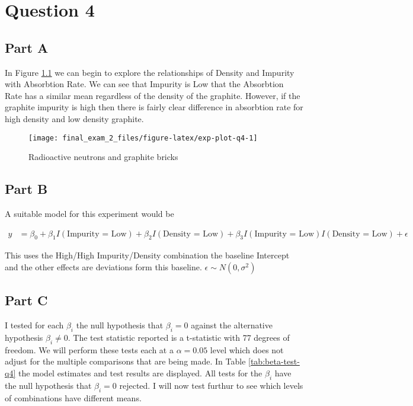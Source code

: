 \documentclass[]{book}
\begin{document}
\hypertarget{question-4}{%
\chapter{Question 4}\label{question-4}}

\hypertarget{part-a-3}{%
\section{Part A}\label{part-a-3}}

In Figure \ref{fig:exp-plot-q4} we can begin to explore the relationships of Density and Impurity with Absorbtion Rate. We can see that Impurity is Low that the Absorbtion Rate has a similar mean regardless of the density of the graphite. However, if the graphite impurity is high then there is fairly clear difference in absorbtion rate for high density and low density graphite.

\begin{figure}

{\centering \texttt{[image: final\_exam\_2\_files/figure-latex/exp-plot-q4-1]} 

}

\caption{Radioactive neutrons and graphite bricks}\label{fig:exp-plot-q4}
\end{figure}

\hypertarget{part-b-3}{%
\section{Part B}\label{part-b-3}}

A suitable model for this experiment would be

\begin{align}
  y &= \beta_0 + \beta_1 I(\text{Impurity = Low}) + \beta_2 I(\text{Density = Low}) + \beta_3 I(\text{Impurity = Low}) I(\text{Density = Low}) + \epsilon
\end{align}

This uses the High/High Impurity/Density combination the baseline Intercept and the other effects are deviations form this baseline. \(\epsilon \sim N(0, \sigma^2)\)

\hypertarget{part-c-3}{%
\section{Part C}\label{part-c-3}}

I tested for each \(\beta_i\) the null hypothesis that \(\beta_i = 0\) against the alternative hypothesis \(\beta_i \neq 0\). The test statistic reported is a t-statistic with 77 degrees of freedom. We will perform these tests each at a \(\alpha = 0.05\) level which does not adjust for the multiple comparisons that are being made. In Table \ref{tab:beta-test-q4} the model estimates and test results are displayed. All tests for the \(\beta_i\) have the null hypothesis that \(\beta_i = 0\) rejected. I will now test furthur to see which levels of combinations have different means.
\end{document}
